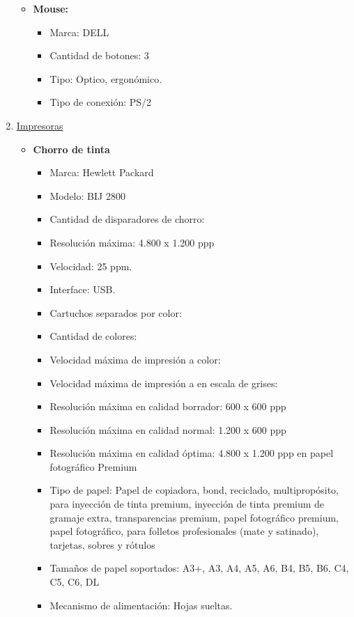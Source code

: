 \begin{enumerate}
\begin{itemize}
    \item \textbf{Mouse:}
    \begin{itemize}
      \item Marca: DELL
      \item Cantidad de botones: 3
      \item Tipo: Optico, ergonómico.
      \item Tipo de conexión: PS/2
    \end{itemize}
  \end{itemize}
  
  \item \underline{Impresoras}
  \begin{itemize}
    \item \textbf{Chorro de tinta}
    \begin{itemize}
      \item Marca: Hewlett Packard
      \item Modelo: BIJ 2800
      \item Cantidad de disparadores de chorro: 
      
      \item Resolución máxima: 4.800 x 1.200 ppp
      \item Velocidad: 25 ppm.
      \item Interface: USB.
      
      \item Cartuchos separados por color:
      \item Cantidad de colores:
      \item Velocidad máxima de impresión a color:
      \item Velocidad máxima de impresión a en escala de grises:
      \item Resolución máxima en calidad borrador: 600 x 600 ppp
      \item Resolución máxima en calidad normal: 1.200 x 600 ppp
      \item Resolución máxima en calidad óptima: 4.800 x 1.200 ppp en papel fotográfico Premium
      
      \item Tipo de papel: Papel de copiadora, bond, reciclado, multipropósito, para inyección de tinta premium, inyección de tinta premium de gramaje extra, transparencias premium, papel fotográfico premium, papel fotográfico, para folletos profesionales (mate y satinado), tarjetas, sobres y rótulos
      \item Tamaños de papel soportados: A3+, A3, A4, A5, A6, B4, B5, B6, C4, C5, C6, DL
      \item Mecanismo de alimentación: Hojas sueltas.
      

\end{itemize}
\end{itemize}
\end{enumerate}
